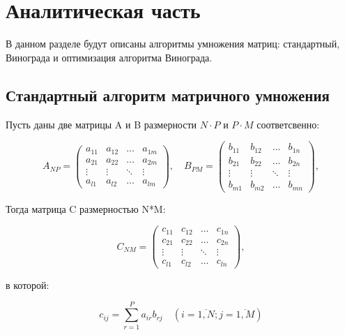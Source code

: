 \chapter{Аналитическая часть}

В данном разделе будут описаны алгоритмы умножения матриц: стандартный, Винограда и оптимизация алгоритма Винограда.

\section{Стандартный алгоритм матричного умножения}

Пусть даны две матрицы A и B размерности $N \cdot P$ и $P \cdot M$ соответсвенно:

\begin{equation}
	A_{NP} = \begin{pmatrix}
		a_{11} & a_{12} & \ldots & a_{1m}\\
		a_{21} & a_{22} & \ldots & a_{2m}\\
		\vdots & \vdots & \ddots & \vdots\\
		a_{l1} & a_{l2} & \ldots & a_{lm}
	\end{pmatrix},
	\quad
	B_{PM} = \begin{pmatrix}
		b_{11} & b_{12} & \ldots & b_{1n}\\
		b_{21} & b_{22} & \ldots & b_{2n}\\
		\vdots & \vdots & \ddots & \vdots\\
		b_{m1} & b_{m2} & \ldots & b_{mn}
	\end{pmatrix},
\end{equation}

Тогда матрица C размерностью N*M:

\begin{equation}
	C_{NM} = \begin{pmatrix}
		c_{11} & c_{12} & \ldots & c_{1n}\\
		c_{21} & c_{22} & \ldots & c_{2n}\\
		\vdots & \vdots & \ddots & \vdots\\
		c_{l1} & c_{l2} & \ldots & c_{ln}
	\end{pmatrix},
\end{equation}

в которой:

\begin{equation}
	\label{eq:M}
	c_{ij} =
	\sum_{r=1}^{P} a_{ir}b_{rj} \quad (i=\overline{1,N}; j=\overline{1,M})
\end{equation}

